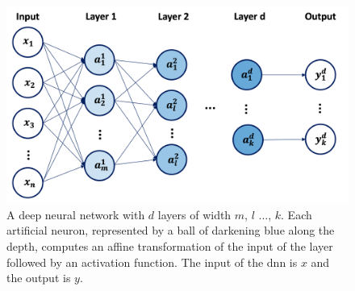 \begin{figure}[h!]
    \center
    \begin{minipage}[l]{0.38\textwidth}
        \caption{A deep neural network with $d$ layers of width $m$, $l$ ..., $k$. Each artificial neuron, represented by a ball of darkening blue along the depth, computes an affine transformation of the input of the layer followed by an activation function. The input of the \gls{dnn} is $x$ and the output is $y$.} 
    \label{fig:neuralnet}
      \end{minipage}
      \begin{minipage}[c]{0.6\textwidth}
        \includegraphics[width=\textwidth]{Images/ML/neuralnet.png}
      \end{minipage}
\end{figure}

